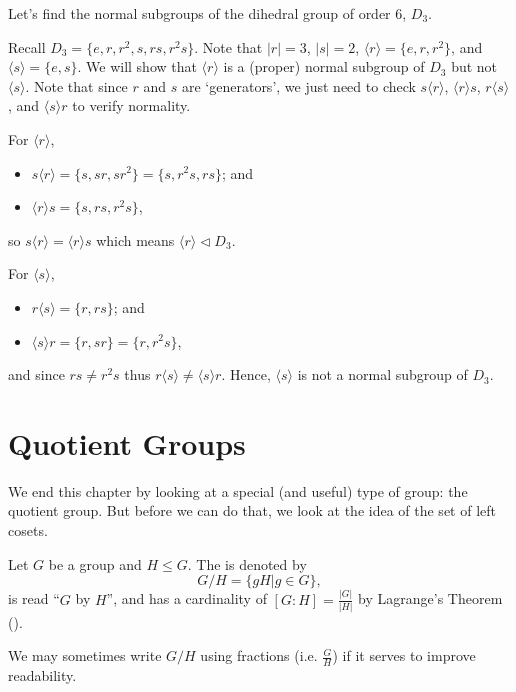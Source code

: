 \begin{example}\label{example-normal-subgroups-of-d3}
    Let's find the normal subgroups of the dihedral group of order 6, $D_3$.

    Recall $D_3 = \{e, r, r^2, s, rs, r^2s\}$. Note that $|r| = 3$, $|s| = 2$, $\langle r \rangle = \{e, r, r^2\}$, and $\langle s \rangle = \{e, s\}$. We will show that $\langle r \rangle$ is a (proper) normal subgroup of $D_3$ but not $\langle s \rangle$. Note that since $r$ and $s$ are `generators', we just need to check $s\langle r\rangle$, $\langle r\rangle s$, $r\langle s\rangle$, and $\langle s\rangle r$ to verify normality.

    For $\langle r \rangle$,
    \begin{itemize}
        \item $s\langle r\rangle = \{s, sr, sr^2\} = \{s, r^2s, rs\}$; and
        \item $\langle r\rangle s = \{s, rs, r^2s\}$,
    \end{itemize}
    so $s\langle r\rangle = \langle r \rangle s$ which means $\langle r \rangle \lhd D_3$.

    For $\langle s \rangle$,
    \begin{itemize}
        \item $r\langle s\rangle = \{r, rs\}$; and
        \item $\langle s \rangle r = \{r, sr\} = \{r, r^2s\}$,
    \end{itemize}
    and since $rs \neq r^2s$ thus $r\langle s\rangle \neq \langle s \rangle r$. Hence, $\langle s \rangle$ is not a normal subgroup of $D_3$.
\end{example}

\section{Quotient Groups}
We end this chapter by looking at a special (and useful) type of group: the quotient group. But before we can do that, we look at the idea of the set of left cosets.

\begin{definition}
    Let $G$ be a group and $H \leq G$. The  is denoted by
    \[
        G/H = \{gH \vert g \in G \},
    \]
    is read ``$G$ by $H$'', and has a cardinality of $[G:H] = \frac{|G|}{|H|}$ by Lagrange's Theorem ().
\end{definition}
\begin{remark}
    We may sometimes write $G/H$ using fractions (i.e. $\frac GH$) if it serves to improve readability.
\end{remark}

